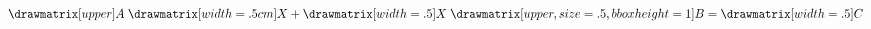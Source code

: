 \documentclass[border=.25cm]{standalone}
\begin{document}
$
    \drawmatrix[upper]A \;
    \drawmatrix[width=.5cm]X +
    \drawmatrix[width=.5]X \;
    \drawmatrix[upper, size=.5, bbox height=1]B =
    \drawmatrix[width=.5]C
$
\end{document}
